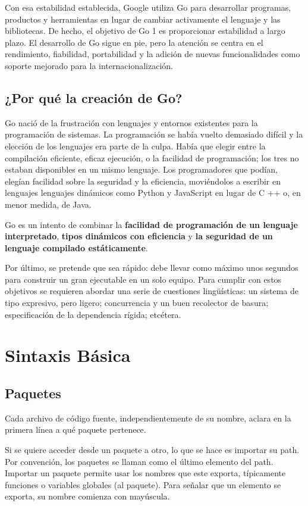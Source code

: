 \documentclass{article}
\begin{document}
Con esa estabilidad establecida, Google utiliza Go para desarrollar programas, productos y herramientas en lugar de cambiar activamente el lenguaje y las bibliotecas. De hecho, el objetivo de Go 1 es proporcionar estabilidad a largo plazo. El desarrollo de Go sigue en pie, pero la atención se centra en el rendimiento, fiabilidad, portabilidad y la adición de nuevas funcionalidades como soporte mejorado para la internacionalización.
\subsection{¿Por qué la creación de Go?}

Go nació de la frustración con lenguajes y entornos existentes para la programación de sistemas. La programación se había vuelto demasiado difícil y la elección de los lenguajes era parte de la culpa. Había que elegir entre la compilación eficiente, eficaz ejecución, o la facilidad de programación; los tres no estaban disponibles en un mismo lenguaje. Los programadores que podían, elegían facilidad sobre la seguridad y la eficiencia, moviéndolos a escribir en lenguajes lenguajes dinámicos como Python y JavaScript en lugar de C ++ o, en menor medida, de Java. 

Go es un intento de combinar la \textbf{facilidad de programación de un lenguaje interpretado}, \textbf{tipos dinámicos con eficiencia} y \textbf{la seguridad de un lenguaje compilado estáticamente}. 

Por último, se pretende que sea rápido: debe llevar como máximo unos segundos para construir un gran ejecutable en un solo equipo. Para cumplir con estos objetivos se requieren abordar una serie de cuestiones lingüísticas: un sistema de tipo expresivo, pero ligero; concurrencia y un buen recolector de basura; especificación de la dependencia rígida; etcétera.

\section{Sintaxis Básica}
\subsection{Paquetes}
Cada archivo de código fuente, independientemente de su nombre, aclara en la primera línea a qué paquete pertenece.

Si se quiere acceder desde un paquete a otro, lo que se hace es importar su path. Por convención, los paquetes se llaman como el último elemento del path. Importar un paquete permite usar los nombres que este exporta, típicamente funciones o variables globales (al paquete). Para señalar que un elemento se exporta, su nombre comienza con mayúscula.
\end{document}
